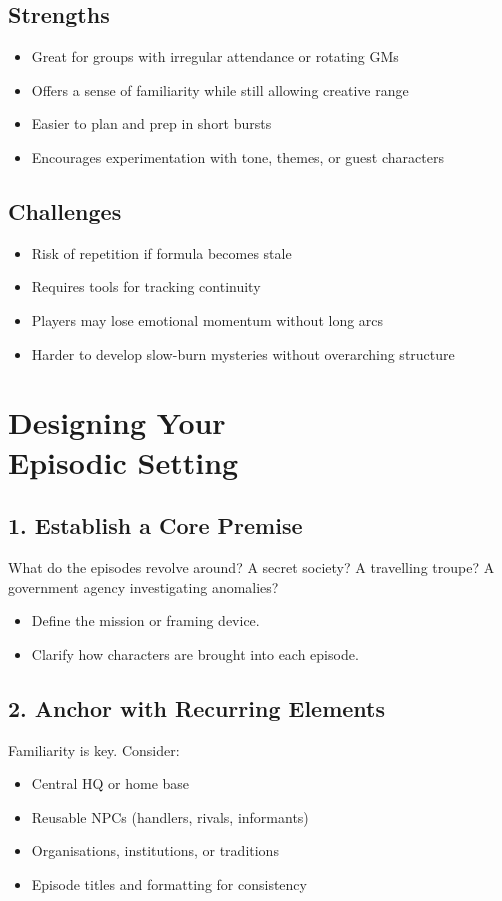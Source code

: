\subsection*{Strengths}
\begin{itemize}
    \item Great for groups with irregular attendance or rotating GMs
    \item Offers a sense of familiarity while still allowing creative range
    \item Easier to plan and prep in short bursts
    \item Encourages experimentation with tone, themes, or guest characters
\end{itemize}

\subsection*{Challenges}
\begin{itemize}
    \item Risk of repetition if formula becomes stale
    \item Requires tools for tracking continuity
    \item Players may lose emotional momentum without long arcs
    \item Harder to develop slow-burn mysteries without overarching structure
\end{itemize}

\section[Designing Your Episodic Setting]{Designing Your\\ Episodic Setting}

\subsection*{1. Establish a Core Premise}
What do the episodes revolve around? A secret society? A travelling troupe? A government agency investigating anomalies?

\begin{itemize}
    \item Define the mission or framing device.
    \item Clarify how characters are brought into each episode.
\end{itemize}

\subsection*{2. Anchor with Recurring Elements}
Familiarity is key. Consider:
\begin{itemize}
    \item Central HQ or home base
    \item Reusable NPCs (handlers, rivals, informants)
    \item Organisations, institutions, or traditions
    \item Episode titles and formatting for consistency
\end{itemize}

